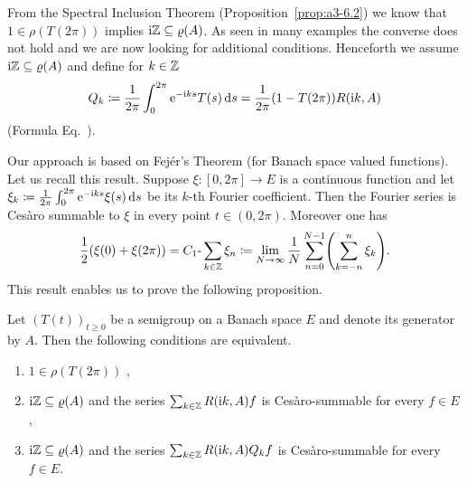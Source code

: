 From the Spectral Inclusion Theorem (Proposition~\ref{prop:a3-6.2}) we know that $1 \in \rho(T(2\pi))$ implies $\im\Z \subseteq \rho(A)$.
As seen in many examples the converse does not hold and we are now looking for additional conditions.
Henceforth we assume $\im\Z \subseteq \rho(A)$ and define for $k \in \mathbb{Z}$
\begin{equation}\label{eq:a3-7.7}
Q_{k}\coloneq \frac{1}{2\pi}\int_{0}^{2\pi} \mathrm{e}^{-\mathrm{i} ks}T(s)\mathop{}\!\mathrm{d}{s} = \frac{1}{2\pi}(1 - T(2\pi))R(\mathrm{i} k,A)
\end{equation}
(\cf Formula Eq.~).

Our approach is based on Fejér's Theorem (for Banach space valued functions).
Let us recall this result.
Suppose $\xi \colon [0,2\pi] \to E$ is a continuous function and let $\xi_{k}\coloneq \frac{1}{2\pi}\int_{0}^{2\pi} \mathrm{e}^{-\mathrm{i} ks}\xi(s)\mathop{}\!\mathrm{d}{s}$ be its $k$-th Fourier coefficient.
Then the Fourier series is Cesàro summable to $\xi$ in every point $t \in (0,2\pi)$.
Moreover one has
\begin{equation}\label{eq:a3-7.8}
\frac{1}{2}(\xi(0) + \xi(2\pi)) = C_{1}\text{-}\sum_{k\in\Z} \xi_{n} \coloneq \lim_{N\to\infty} \frac{1}{N}\sum_{n=0}^{N-1}\mleft( \sum_{k=-n}^{n} \xi_{k} \mright) .
\end{equation}
This result enables us to prove the following proposition.
\begin{proposition}\label{prop:a3-7.8}
%
Let $(T(t))_{t\geq 0}$ be a semigroup on a Banach space $E$ and denote its generator by $A$.
Then the following conditions are equivalent.
\begin{enumerate}[\upshape (a)]

\item $1 \in \rho(T(2\pi))$ ,

\item 
$\im\Z \subseteq \rho(A)$ and the series $\sum_{k\in\mathbb{Z}} R(\mathrm{i} k,A)f$ is Cesàro-summable for every $f \in E$,

\item 
$\im\Z \subseteq \rho(A)$ and the series $\sum_{k\in\mathbb{Z}} R(\mathrm{i} k,A)Q_{k}f$ is Cesàro-summable for every $f \in E$. 

\end{enumerate}
\end{proposition}
